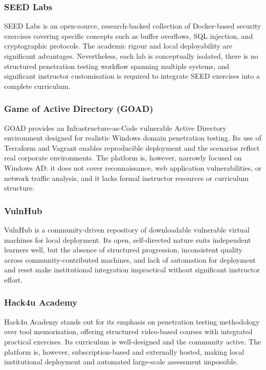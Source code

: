 \documentclass[a4paper,11pt]{article}
\begin{document}
\subsubsection{SEED Labs}
SEED Labs \cite{seedlabs} is an open-source, research-backed collection of Docker-based security
exercises covering specific concepts such as buffer overflows, SQL injection, and cryptographic
protocols. The academic rigour and local deployability are significant advantages. Nevertheless,
each lab is conceptually isolated, there is no structured penetration testing workflow spanning
multiple systems, and significant instructor customisation is required to integrate SEED exercises
into a complete curriculum.

\subsubsection{Game of Active Directory (GOAD)}
GOAD \cite{goad} provides an Infrastructure-as-Code vulnerable Active Directory environment
designed for realistic Windows domain penetration testing. Its use of Terraform and Vagrant enables
reproducible deployment and the scenarios reflect real corporate environments. The platform is,
however, narrowly focused on Windows AD: it does not cover reconnaissance, web application
vulnerabilities, or network traffic analysis, and it lacks formal instructor resources or
curriculum structure.

\subsubsection{VulnHub}
VulnHub \cite{vulnhub} is a community-driven repository of downloadable vulnerable virtual machines
for local deployment. Its open, self-directed nature suits independent learners well, but the
absence of structured progression, inconsistent quality across community-contributed machines,
and lack of automation for deployment and reset make institutional integration impractical
without significant instructor effort.

\subsubsection{Hack4u Academy}
Hack4u Academy \cite{hack4u} stands out for its emphasis on penetration testing methodology over
tool memorisation, offering structured video-based courses with integrated practical exercises.
Its curriculum is well-designed and the community active. The platform is, however,
subscription-based and externally hosted, making local institutional deployment and automated
large-scale assessment impossible.
\end{document}
